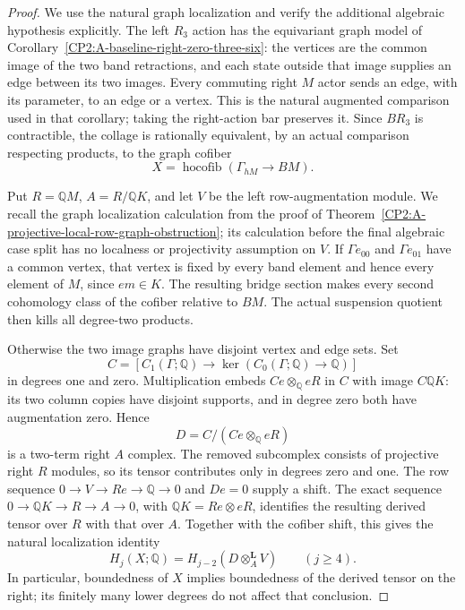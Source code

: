 \begin{proof}
We use the natural graph localization and verify the additional
algebraic hypothesis explicitly.  The left $R_3$ action has the
equivariant graph model of
Corollary~\ref{CP2:A-baseline-right-zero-three-six}: the vertices
are the common image of the two band retractions, and each state
outside that image supplies an edge between its two images.
Every commuting right $M$ actor sends an edge, with its parameter,
to an edge or a vertex.  This is the natural augmented comparison
used in that corollary; taking the right-action bar preserves it.
Since $BR_3$ is contractible, the collage is rationally equivalent,
by an actual comparison respecting products, to the graph cofiber
\[
 X=\operatorname{hocofib}(\Gamma_{hM}\longrightarrow BM).
\]

Put $R=\mathbb QM$, $A=R/\mathbb QK$, and let $V$ be the
left row-augmentation module.  We recall the graph localization
calculation from the proof of
Theorem~\ref{CP2:A-projective-local-row-graph-obstruction}; its
calculation before the final algebraic case split has no localness
or projectivity assumption on $V$.
If $\Gamma e_{00}$ and $\Gamma e_{01}$ have a common vertex,
that vertex is fixed by every band element and hence every element
of $M$, since $em\in K$.  The resulting bridge section makes
every second cohomology class of the cofiber relative to $BM$.
The actual suspension quotient then kills all degree-two products.

Otherwise the two image graphs have disjoint vertex and edge
sets.  Set
\[
 C=[C_1(\Gamma;\mathbb Q)\longrightarrow
                  \ker(C_0(\Gamma;\mathbb Q)\to\mathbb Q)]
\]
in degrees one and zero.  Multiplication embeds
$Ce\otimes_{\mathbb Q}eR$ in $C$ with image $C\mathbb QK$:
its two column copies have disjoint supports, and in degree zero
both have augmentation zero.  Hence
\[
 D=C/(Ce\otimes_{\mathbb Q}eR)
\]
is a two-term right $A$ complex.  The removed subcomplex consists
of projective right $R$ modules, so its tensor contributes only
in degrees zero and one.  The row sequence
$0\to V\to Re\to\mathbb Q\to0$ and $De=0$ supply a shift.
The exact sequence $0\to\mathbb QK\to R\to A\to0$, with
$\mathbb QK=Re\otimes eR$, identifies the resulting derived
tensor over $R$ with that over $A$.  Together with the cofiber
shift, this gives the natural localization identity
\[
 H_j(X;\mathbb Q)=H_{j-2}(D\otimes_A^{\mathbf L}V)
                    \qquad(j\ge4).
\]
In particular, boundedness of $X$ implies boundedness of the
derived tensor on the right; its finitely many lower degrees
do not affect that conclusion.


\end{proof}
